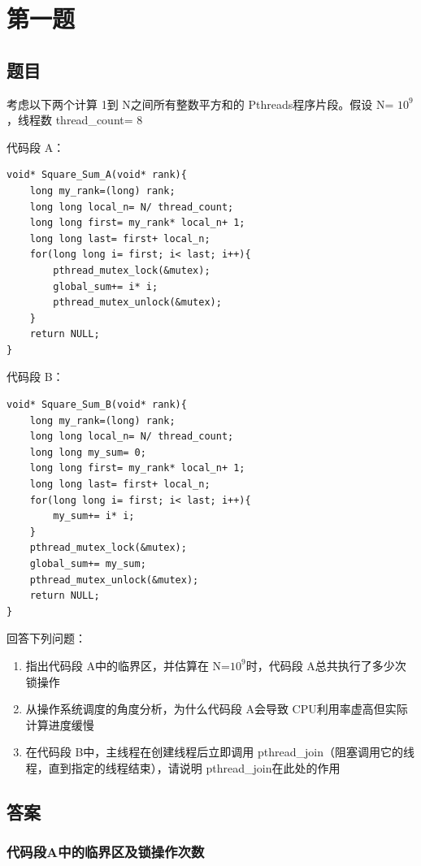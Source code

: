 \chapter{第一题}

\section{题目}

考虑以下两个计算 1到 N之间所有整数平方和的 Pthreads程序片段。假设 N= $10^9$，线程数 thread\_count= 8

代码段 A：
\begin{lstlisting}[style=cleancpp]
void* Square_Sum_A(void* rank){ 
    long my_rank=(long) rank; 
    long long local_n= N/ thread_count;
    long long first= my_rank* local_n+ 1;
    long long last= first+ local_n;
    for(long long i= first; i< last; i++){ 
        pthread_mutex_lock(&mutex); 
        global_sum+= i* i;
        pthread_mutex_unlock(&mutex);
    }
    return NULL;
}
\end{lstlisting}

代码段 B：
\begin{lstlisting}[style=cleancpp]
void* Square_Sum_B(void* rank){ 
    long my_rank=(long) rank; 
    long long local_n= N/ thread_count;
    long long my_sum= 0;
    long long first= my_rank* local_n+ 1;
    long long last= first+ local_n;
    for(long long i= first; i< last; i++){ 
        my_sum+= i* i;
    }
    pthread_mutex_lock(&mutex);
    global_sum+= my_sum;
    pthread_mutex_unlock(&mutex); 
    return NULL;
}
\end{lstlisting}

回答下列问题：
\begin{enumerate}
    \item 指出代码段 A中的临界区，并估算在 N=$10^9$时，代码段 A总共执行了多少次锁操作
    \item 从操作系统调度的角度分析，为什么代码段 A会导致 CPU利用率虚高但实际计算进度缓慢
    \item 在代码段 B中，主线程在创建线程后立即调用 pthread\_join（阻塞调用它的线程，直到指定的线程结束），请说明 pthread\_join在此处的作用
\end{enumerate}

\section{答案}
\subsection{代码段A中的临界区及锁操作次数}

